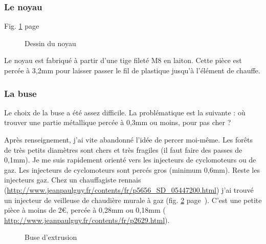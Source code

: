 \subsubsection{Le noyau}%
\noindent Fig. \ref{sch_noyau} page~\pageref{sch_noyau} \par %
\begin{figure}%
   \caption{\label{sch_noyau} Dessin du noyau}%
\end{figure}%
Le noyau est fabriqué à partir d'une tige fileté M8 en laiton. Cette pièce est percée à 3,2mm %
pour laisser passer le fil de plastique jusqu'à l'élément de chauffe.%
\subsubsection{La buse}%
Le choix de la buse a été assez difficile. La problématique est la suivante : où trouver %
une partie métallique percée à 0,3mm ou moins, pour pas cher ? \par%
Après renseignement, j'ai vite abandonné l'idée de percer moi-même. Les forêts de très petits %
diamètres sont chers et très fragiles (il faut faire des passes de 0,1mm). %
Je me suis rapidement orienté vers les injecteurs de cyclomoteurs ou de gaz. Les injecteurs de %
cyclomoteurs sont percés gros (minimum 0,6mm). Reste les injecteurs gaz. Chez un chauffagiste %
rennais (\url{http://www.jeanpaulguy.fr/contents/fr/p5656_SD_05447200.html}) j'ai trouvé un injecteur de veilleuse de chaudière murale à gaz (fig. \ref{buse} %
page~\pageref{buse}). C'est une petite pièce à moins de 2\euro{}, percée à 0,28mm ou 0,18mm (%
\url{http://www.jeanpaulguy.fr/contents/fr/p2629.html}).%
\begin{figure}%
   \caption{\label{buse} Buse d'extrusion}%
\end{figure}%
